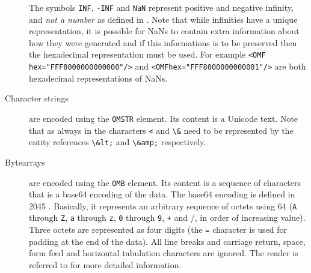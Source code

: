 \begin{description}
The symbols \lstinline|INF|, \lstinline|-INF| and \lstinline|NaN| represent positive and
negative infinity, and \emph{not a number} as defined in \cite{ieee754_85}.  Note that
while infinities have a unique representation, it is possible for NaNs to contain extra
information about how they were generated and if this informations is to be preserved then
the hexadecimal representation must be used.  For example
\lstinline|<OMF hex="FFF8000000000000"/>| and \lstinline|<OMFhex="FFF8000000000001"/>| are
both hexadecimal representations of NaNs.
\item[Character strings] are encoded using the \lstinline|OMSTR| element.  Its
  content is a Unicode text. Note that as always in \XML the characters \lstinline|<| and
  \lstinline|\&| need to be represented by the entity references \lstinline|\&lt;|
  and \lstinline|\&amp;| respectively.
\item[Bytearrays] are encoded using the \lstinline|OMB| element. Its content is
  a sequence of characters that is a base64 encoding of the data.  The base64 encoding is
  defined in  2045 \cite{rfc2045}.  Basically, it represents an arbitrary
  sequence of octets using 64  (\lstinline|A| through \lstinline|Z|,
  \lstinline|a| through \lstinline|z|, \lstinline|0| through \lstinline|9|,
  \lstinline|+| and /, in order of increasing value). Three octets are represented as
  four digits (the \lstinline|=| character is used for padding at the end of the
  data). All line breaks and carriage return, space, form feed and horizontal tabulation
  characters are ignored. The reader is referred to \cite{rfc2045} for more detailed
  information.
\end{description}
 
